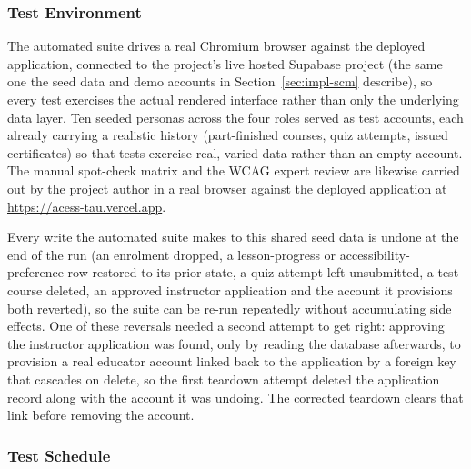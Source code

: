 \documentclass[12pt, oneside]{article} %
\begin{document}
\subsubsection{Test Environment}

The automated suite drives a real Chromium browser against the deployed application, connected to the project's live hosted Supabase project (the same one the seed data and demo accounts in Section~\ref{sec:impl-scm} describe), so every test exercises the actual rendered interface rather than only the underlying data layer. Ten seeded personas across the four roles served as test accounts, each already carrying a realistic history (part-finished courses, quiz attempts, issued certificates) so that tests exercise real, varied data rather than an empty account. The manual spot-check matrix and the WCAG expert review are likewise carried out by the project author in a real browser against the deployed application at \url{https://acess-tau.vercel.app}.

Every write the automated suite makes to this shared seed data is undone at the end of the run (an enrolment dropped, a lesson-progress or accessibility-preference row restored to its prior state, a quiz attempt left unsubmitted, a test course deleted, an approved instructor application and the account it provisions both reverted), so the suite can be re-run repeatedly without accumulating side effects. One of these reversals needed a second attempt to get right: approving the instructor application was found, only by reading the database afterwards, to provision a real educator account linked back to the application by a foreign key that cascades on delete, so the first teardown attempt deleted the application record along with the account it was undoing. The corrected teardown clears that link before removing the account.

\subsubsection{Test Schedule}
\end{document}
